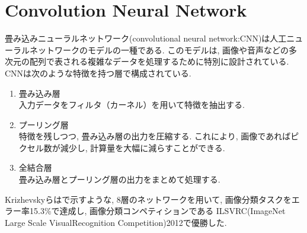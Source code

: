 
\section{Convolution Neural Network}
畳み込みニューラルネットワーク(convolutional neural network:CNN)は人工ニューラルネットワークのモデルの一種である. このモデルは, 画像や音声などの多次元の配列で表される複雑なデータを処理するために特別に設計されている. CNNは次のような特徴を持つ層で構成されている.
\begin{enumerate}
  \item 畳み込み層\\入力データをフィルタ（カーネル）を用いて特徴を抽出する.
  \item プーリング層\\特徴を残しつつ, 畳み込み層の出力を圧縮する. これにより, 画像であればピクセル数が減少し, 計算量を大幅に減らすことができる.
  \item 全結合層\\畳み込み層とプーリング層の出力をまとめて処理する.
\end{enumerate}

Krizhevskyら\cite{AlexNet}はで示すような, 8層のネットワークを用いて, 画像分類タスクをエラー率15.3\%で達成し, 画像分類コンペティションである ILSVRC(ImageNet Large Scale VisualRecognition Competition)2012で優勝した.

\vspace{0.5cm}

